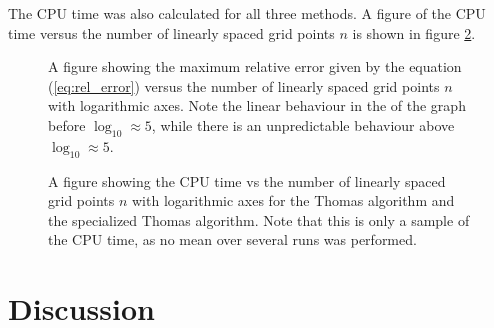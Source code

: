 \documentclass[twocolumn]{aastex62}
\begin{document}
The CPU time was also calculated for all three methods. A figure of the CPU time versus the number of linearly spaced grid points $n$ is shown in figure \ref{fig:CPUtimeplot}.

\begin{figure}[ht]
	\caption{A figure showing the maximum relative error given by the equation (\ref{eq:rel_error}) versus the number of linearly spaced grid points $n$ with logarithmic axes. Note the linear behaviour in the of the graph before $\log_{10} \approx 5$, while there is an unpredictable behaviour above $\log_{10} \approx 5$.} 
	\label{fig:specerror}
\end{figure}

\begin{figure}[ht]
	\caption{A figure showing the CPU time vs the number of linearly spaced grid points $n$ with logarithmic axes for the Thomas algorithm and the specialized Thomas algorithm. Note that this is only a sample of the CPU time, as no mean over several runs was performed.}	\label{fig:CPUtimeplot}
\end{figure}

\section{Discussion} \label{sec:discussion}
\end{document}
